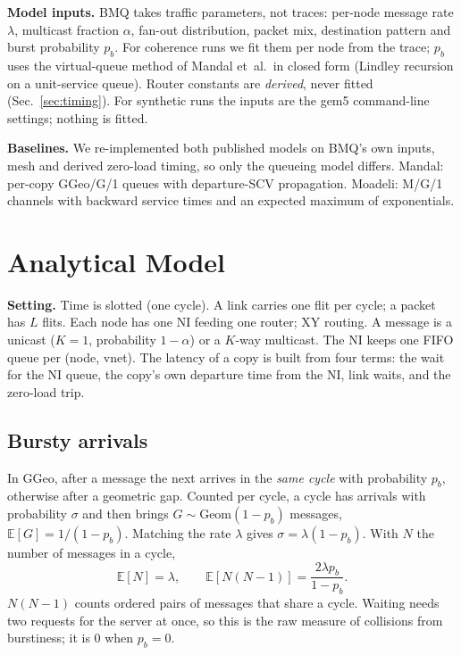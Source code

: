 \documentclass[conference]{IEEEtran}
\newcommand{\E}{\mathbb{E}}
\newcommand{\pb}{p_b}
\begin{document}
\textbf{Model inputs.} BMQ takes traffic parameters, not traces: per-node message rate $\lambda$, multicast fraction $\alpha$, fan-out distribution, packet mix, destination pattern and burst probability $\pb$. For coherence runs we fit them per node from the trace; $\pb$ uses the virtual-queue method of Mandal et~al.\ in closed form (Lindley recursion on a unit-service queue). Router constants are \emph{derived}, never fitted (Sec.~\ref{sec:timing}). For synthetic runs the inputs are the gem5 command-line settings; nothing is fitted.

\textbf{Baselines.} We re-implemented both published models on BMQ's own inputs, mesh and derived zero-load timing, so only the queueing model differs. Mandal: per-copy GGeo/G/1 queues with departure-SCV propagation. Moadeli: M/G/1 channels with backward service times and an expected maximum of exponentials.

\section{Analytical Model}
\label{sec:model}
\textbf{Setting.} Time is slotted (one cycle). A link carries one flit per cycle; a packet has $L$ flits. Each node has one NI feeding one router; XY routing. A message is a unicast ($K{=}1$, probability $1{-}\alpha$) or a $K$-way multicast. The NI keeps one FIFO queue per (node, vnet). The latency of a copy is built from four terms: the wait for the NI queue, the copy's own departure time from the NI, link waits, and the zero-load trip.



\subsection{Bursty arrivals}
In GGeo, after a message the next arrives in the \emph{same cycle} with probability $\pb$, otherwise after a geometric gap. Counted per cycle, a cycle has arrivals with probability $\sigma$ and then brings $G\sim\mathrm{Geom}(1{-}\pb)$ messages, $\E[G]=1/(1{-}\pb)$. Matching the rate $\lambda$ gives $\sigma=\lambda(1{-}\pb)$. With $N$ the number of messages in a cycle,
\begin{equation}
\E[N]=\lambda,\qquad \E[N(N{-}1)]=\frac{2\lambda\pb}{1-\pb}.
\label{eq:N}
\end{equation}
$N(N{-}1)$ counts ordered pairs of messages that share a cycle. Waiting needs two requests for the server at once, so this is the raw measure of collisions from burstiness; it is 0 when $\pb{=}0$.
\end{document}
